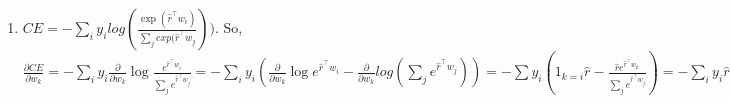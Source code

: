 \documentclass{article}
\begin{document}
\begin{enumerate}
\begin{enumerate}
\item $CE = - \sum_i y_i log(\frac{\exp(\hat{r}^{\intercal}w_i)}{\sum_j exp(\hat{r}^{\intercal}w_j}))$. So, $\frac{\partial CE}{\partial w_k} = -\sum_i y_i \frac{\partial}{\partial w_k} \log \frac{e^{\hat{r}^{\intercal}w_i}}{\sum_j e^{\hat{r}^{\intercal}w_j}} = -\sum_i y_i(\frac{\partial}{\partial w_k}\log e^{\hat{r}^{\intercal}w_i} - \frac{\partial}{\partial w_k} log(\sum_j e^{\hat{r}^{\intercal}w_j})) = - \sum y_i (1_{k=i}\hat{r} - \frac{\hat{r}e^{\hat{r}^{\intercal}w_k}}{\sum_j e^{\hat{r}^{\intercal}w_j}}) = - \sum_i y_i \hat{r}(1_{k=i} - Pr(word_k | \hat{r}, w))$
\end{enumerate}
\end{enumerate}
\end{document}
